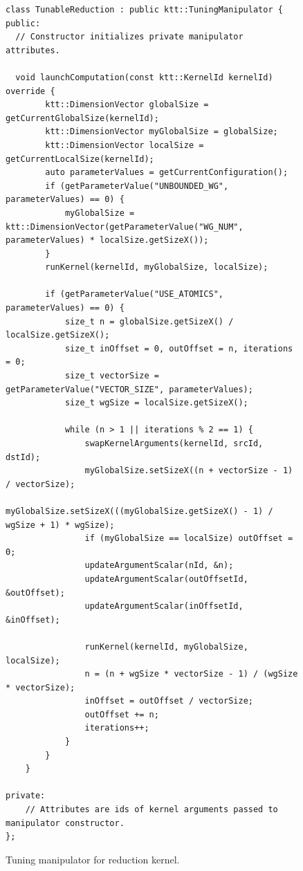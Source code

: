 \documentclass
[
    digital, %
    oneside, %
    table, %
    nolof, %
    nolot, %
    nocover %
]{fithesis3}
\begin{document}
\begin{figure}
\footnotesize
\begin{adjustwidth}{-1cm}{-1cm}
\begin{lstlisting}
class TunableReduction : public ktt::TuningManipulator {
public:
  // Constructor initializes private manipulator attributes.

  void launchComputation(const ktt::KernelId kernelId) override {
        ktt::DimensionVector globalSize = getCurrentGlobalSize(kernelId);
        ktt::DimensionVector myGlobalSize = globalSize;
        ktt::DimensionVector localSize = getCurrentLocalSize(kernelId);
        auto parameterValues = getCurrentConfiguration();
        if (getParameterValue("UNBOUNDED_WG", parameterValues) == 0) {
            myGlobalSize = ktt::DimensionVector(getParameterValue("WG_NUM", parameterValues) * localSize.getSizeX());
        }
        runKernel(kernelId, myGlobalSize, localSize);

        if (getParameterValue("USE_ATOMICS", parameterValues) == 0) {
            size_t n = globalSize.getSizeX() / localSize.getSizeX();
            size_t inOffset = 0, outOffset = n, iterations = 0;
            size_t vectorSize = getParameterValue("VECTOR_SIZE", parameterValues);
            size_t wgSize = localSize.getSizeX();

            while (n > 1 || iterations % 2 == 1) {
                swapKernelArguments(kernelId, srcId, dstId);
                myGlobalSize.setSizeX((n + vectorSize - 1) / vectorSize);
                myGlobalSize.setSizeX(((myGlobalSize.getSizeX() - 1) / wgSize + 1) * wgSize);
                if (myGlobalSize == localSize) outOffset = 0;
                updateArgumentScalar(nId, &n);
                updateArgumentScalar(outOffsetId, &outOffset);
                updateArgumentScalar(inOffsetId, &inOffset);

                runKernel(kernelId, myGlobalSize, localSize);
                n = (n + wgSize * vectorSize - 1) / (wgSize * vectorSize);
                inOffset = outOffset / vectorSize;
                outOffset += n;
                iterations++;
            }
        }
    }

private:
    // Attributes are ids of kernel arguments passed to manipulator constructor.
};
\end{lstlisting}
\caption{Tuning manipulator for reduction kernel.}
\label{reduction-example-manipulator}
\end{adjustwidth}
\end{figure}
\end{document}
